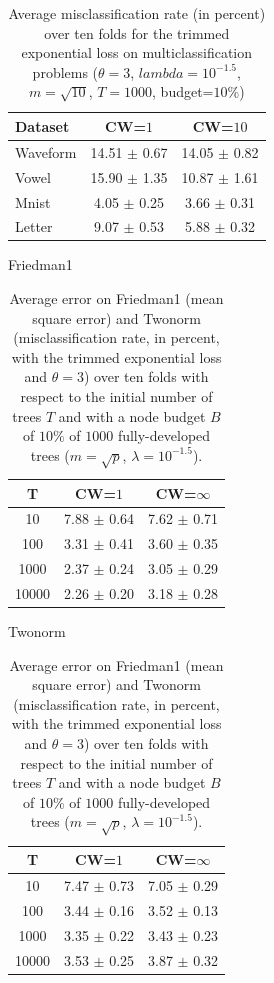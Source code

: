 \documentclass{article}
\newcommand{\bestA}{\cellcolor{orange}}
\begin{document}
\begin{table}[t]
\caption{Average misclassification rate (in percent) over ten folds for the 
trimmed exponential loss on multiclassification problems ($\theta=3$, 
$lambda=10^{-1.5}$, $m=\sqrt{10}$, $T=1000$, budget=$10\%$)}
\label{tab:cwMulti}
\begin{center}
\begin{small}
\begin{sc}
\begin{tabular}{l|cc}
\hline
Dataset & CW=$1$ & CW=$10$ \\
\hline
Waveform & 14.51 $\pm$ 0.67 & \bestA 14.05 $\pm$ 0.82 \\
Vowel & 15.90 $\pm$ 1.35 & \bestA 10.87 $\pm$ 1.61 \\
Mnist & 4.05 $\pm$ 0.25 & \bestA 3.66 $\pm$ 0.31 \\
Letter & 9.07 $\pm$ 0.53 & \bestA 5.88 $\pm$ 0.32 \\
\hline
\end{tabular}
\end{sc}
\end{small}
\end{center}
\vskip -0.1in
\end{table}



\begin{table}[t]
\caption{Average error on Friedman1 (mean square error) and Twonorm 
(misclassification rate, in percent, with the trimmed exponential loss and 
$\theta=3$) over ten folds with respect to the initial number of trees $T$ and 
with a node budget $B$ of $10\%$ of $1000$ fully-developed trees 
($m=\sqrt{p}$, $\lambda=10^{-1.5}$).}
\label{tab:poolsizeError}
\begin{center}
\begin{small}
Friedman1\\
\begin{tabular}{c|cc}
\hline
T & CW=$1$ & CW=$\infty$ \\
\hline
10 & 7.88 $\pm$ 0.64 & 7.62 $\pm$ 0.71 \\
100 & 3.31 $\pm$ 0.41 & 3.60 $\pm$ 0.35 \\
1000 & 2.37 $\pm$ 0.24 & 3.05 $\pm$ 0.29 \\
10000 & 2.26 $\pm$ 0.20 & 3.18 $\pm$ 0.28 \\
\hline
\end{tabular}
\par
Twonorm \\
\begin{tabular}{c|cc}
\hline
T & CW=$1$ & CW=$\infty$ \\
\hline
10 & 7.47 $\pm$ 0.73 & 7.05 $\pm$ 0.29 \\
100 & 3.44 $\pm$ 0.16 & 3.52 $\pm$ 0.13 \\
1000 & 3.35 $\pm$ 0.22 & 3.43 $\pm$ 0.23 \\
10000 & 3.53 $\pm$ 0.25 & 3.87 $\pm$ 0.32 \\
\hline
\end{tabular}
\end{small}
\end{center}
\vskip -0.1in
\end{table}
\end{document}
